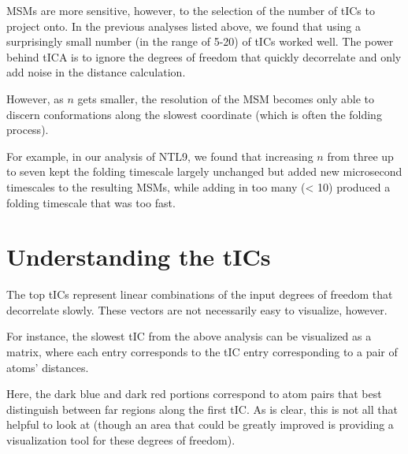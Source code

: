 \documentclass[12pt]{article}
\begin{document}
MSMs are more sensitive, however, to the selection of the number of tICs to project onto. In the previous analyses listed above, we found that using a surprisingly small number (in the range of 5-20) of tICs worked well. The power behind tICA is to ignore the degrees of freedom that quickly decorrelate and only add noise in the distance calculation.

However, as $n$ gets smaller, the resolution of the MSM becomes only able to discern conformations along the slowest coordinate (which is often the folding process). 

For example, in our analysis of NTL9, we found that increasing $n$ from three up to seven kept the folding timescale largely unchanged but added new microsecond timescales to the resulting MSMs, while adding in too many (< 10) produced a folding timescale that was too fast.

\section{Understanding the tICs}

The top tICs represent linear combinations of the input degrees of freedom that decorrelate slowly. These vectors are not necessarily easy to visualize, however.

For instance, the slowest tIC from the above analysis can be visualized as a matrix, where each entry corresponds to the tIC entry corresponding to a pair of atoms' distances.
\begin{figure}[h!]
\end{figure} Here, the dark blue and dark red portions correspond to atom pairs that best distinguish between far regions along the first tIC. As is clear, this is not all that helpful to look at (though an area that could be greatly improved is providing a visualization tool for these degrees of freedom).
\end{document}
